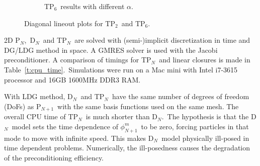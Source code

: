 \documentclass[review]{elsarticle}
\newcommand{\pn}{P$_N$}
\newcommand{\dn}{D$_N$}
\begin{document}
{\begin{figure}[ht!]
\begin{subfigure}{.5\textwidth}
\begin{center}
			\caption[]{TP$_6$\ results with different $\alpha$.}%
			\label{f:tp6-line}
		\end{center}
	\end{subfigure}
	\caption[]{\label{f:tp-lines}Diagonal lineout plots for TP$_2$\ and TP$_6$.}
\end{figure}
	}

{
2D \pn,\ \dn\ and T\pn\ are solved with (semi-)implicit discretization in time and DG/LDG method in space. A GMRES solver is used with the Jacobi preconditioner. A comparison of timings for T\pn\ and linear closures is made in Table\ \ref{t:cpu_time}.\ Simulations were run on a Mac mini with Intel i7-3615 processor and 16GB 1600MHz DDR3 RAM.
}

{
With LDG method, \dn\ and T\pn\ have the same number of degrees of freedom (DoFs) as P$_{N+1}$\ with the same basis functions used on the same mesh. The overall CPU time of T\pn\ is much shorter than \dn.\ The hypothesis is that the \dn\ model sets the time dependence of $\phi_{N+1}^m$\ to be zero, forcing particles in that mode to move with infinite speed. This makes \dn\ model physically ill-posed in time dependent problems. Numerically, the ill-posedness causes the degradation of the preconditioning efficiency.
}
\end{document}
